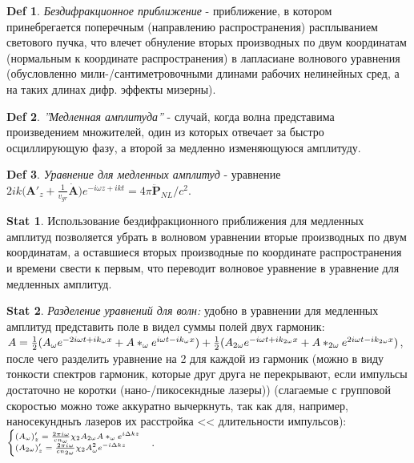 \documentclass[a4paper,12pt]{article}
\theoremstyle{definition} %
\newtheorem{Stat}{Stat}[section]
\theoremstyle{definition} %
\newtheorem{Def}{Def}[section]
\theoremstyle{remark} %
\begin{document}
\begin{Def}\label{def \theDef}
	\textit{Бездифракционное приближение} - приближение, в котором принебрегается поперечным (направлению распространения) расплыванием светового пучка, что влечет обнуление вторых производных по двум координатам (нормальным к координате распространения) в лапласиане волнового уравнения (обусловленно мили-/сантиметровочными длинами рабочих нелинейных сред, а на таких длинах дифр. эффекты мизерны).
\end{Def}
\begin{Def}\label{def \theDef}
	\textit{''Медленная амплитуда''} - случай, когда волна представима произведением множителей, один из которых отвечает за быстро осциллирующую фазу, а второй за медленно изменяющуюся амплитуду.
\end{Def}
\begin{Def}\label{def \theDef}
	\textit{Уравнение для медленных амплитуд} - уравнение $2ik \big( \mathbf{A}'_{z} + \frac{1}{v_{gr}} \dot{\mathbf{A}} \big) e^{-i\omega z + ikt} = 4\pi \ddot{\mathbf{P}}_{NL}/c^{2}$.
\end{Def}
\begin{Stat}\label{stat \theStat}
	Использование бездифракционного приближения для медленных амплитуд позволяется убрать в волновом уравнении вторые производных по двум координатам, а оставшиеся вторых производные по координате распространения и времени свести к первым, что переводит волновое уравнение в уравнение для медленных амплитуд.
\end{Stat}
\begin{Stat}\label{stat \theStat}
	\textit{Разделение уравнений для волн:} удобно в уравнении для медленных амплитуд представить поле в видел суммы полей двух гармоник: $A = \frac{1}{2} (A_{\omega}e^{-2i\omega t +i k_{\omega}x} + A*_{\omega}e^{i\omega t -i k_{\omega}x}) + \\ \frac{1}{2} (A_{2\omega}e^{-i\omega t +i k_{2\omega}x} + A*_{2\omega}e^{2i\omega t -i k_{2\omega}x})$, после чего разделить уравнение на 2 для каждой из гармоник (можно в виду тонкости спектров гармоник, которые друг друга не перекрывают, если импульсы достаточно не коротки (нано-/пикосекндные лазеры)) (слагаемые с групповой скоростью можно тоже аккуратно вычеркнуть, так как для, например, наносекундныъ лазеров их расстройка << длительности импульсов): $\scriptsize
	\begin{cases}
		(A_{\omega})'_{z}=\frac{2\pi i \omega}{cn_{\omega}} \chi_{2} A_{2\omega}A*_{\omega} e^{i \Delta k z} \\
		(A_{2\omega})'_{z}=\frac{2\pi i \omega}{cn_{2\omega}} \chi_{2} A_{\omega}^{2} e^{- i \Delta k z} 
	\end{cases}$.
\end{Stat}
\end{document}

